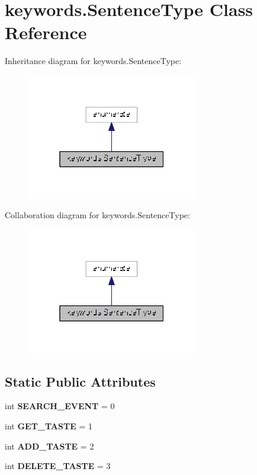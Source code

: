 \section{keywords.\+Sentence\+Type Class Reference}
\label{classkeywords_1_1_sentence_type}


Inheritance diagram for keywords.\+Sentence\+Type\+:
\nopagebreak
\begin{figure}[H]
\begin{center}
\leavevmode
\includegraphics[width=211pt]{classkeywords_1_1_sentence_type__inherit__graph}
\end{center}
\end{figure}


Collaboration diagram for keywords.\+Sentence\+Type\+:
\nopagebreak
\begin{figure}[H]
\begin{center}
\leavevmode
\includegraphics[width=211pt]{classkeywords_1_1_sentence_type__coll__graph}
\end{center}
\end{figure}
\subsection*{Static Public Attributes}
\begin{DoxyCompactItemize}
\item 
int {\bf S\+E\+A\+R\+C\+H\+\_\+\+E\+V\+E\+NT} = 0
\item 
int {\bf G\+E\+T\+\_\+\+T\+A\+S\+TE} = 1
\item 
int {\bf A\+D\+D\+\_\+\+T\+A\+S\+TE} = 2
\item 
int {\bf D\+E\+L\+E\+T\+E\+\_\+\+T\+A\+S\+TE} = 3
\end{DoxyCompactItemize}



